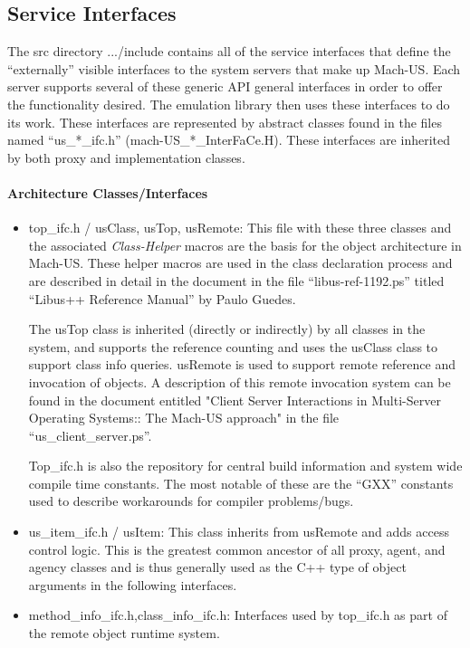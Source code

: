 \subsection{Service Interfaces}
The src directory .../include contains all of the service interfaces
that define the ``externally'' visible interfaces to the system servers
that make up Mach-US.  Each server supports several of these generic
API general interfaces in order to offer the functionality desired.
The emulation library then uses these interfaces to do its work.
These interfaces are represented by abstract classes found in the
files named ``us\_*\_ifc.h'' (mach-US\_*\_InterFaCe.H).
These interfaces are inherited by both
proxy and implementation classes.

\paragraph{Architecture Classes/Interfaces}
\begin{itemize}
\item{top\_ifc.h / usClass, usTop, usRemote}:
This file with these three classes
and the associated {\em Class-Helper} macros are the basis for the object
architecture in Mach-US.  These helper macros are used in the class declaration
process and are described in detail in the document in the file
``libus-ref-1192.ps'' titled ``Libus++ Reference Manual'' by Paulo Guedes.

The usTop class is inherited (directly or indirectly) by all classes in the
system, and supports the reference counting and uses the usClass class to
support class info queries.  usRemote is used to support remote reference
and invocation of objects.  A description of this remote invocation
system can be found in the document entitled
"Client Server Interactions in Multi-Server Operating Systems:: The Mach-US approach" in the file ``us\_client\_server.ps''.

Top\_ifc.h is also the repository for central build information and system wide
compile time constants.  The most notable of these are the ``GXX'' constants
used to describe workarounds for compiler problems/bugs.

\item{us\_item\_ifc.h /  usItem}:
This class inherits from usRemote and adds access control logic.  This
is the greatest common ancestor of all proxy, agent, and agency classes
and is thus generally used as the C++ type of object arguments in the
following interfaces.

\item{method\_info\_ifc.h,class\_info\_ifc.h}: Interfaces used by top\_ifc.h as
part of the remote object runtime system.
\end{itemize}


